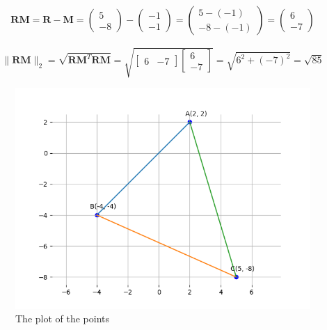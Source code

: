 \documentclass[journal]{IEEEtran}
\numberwithin{equation}{enumi}
\numberwithin{figure}{enumi}
\begin{document}
\begin{align}
\mathbf{RM} = \mathbf{R} - \mathbf{M} = \begin{pmatrix} 5 \\ -8 \end{pmatrix} - \begin{pmatrix} -1 \\ -1 \end{pmatrix} = \begin{pmatrix} 5 - (-1) \\ -8 - (-1) \end{pmatrix} = \begin{pmatrix} 6 \\ -7 \end{pmatrix}
\end{align}





\[
\| \mathbf{RM} \|_2 = \sqrt{\mathbf{RM}^T \mathbf{RM}} = \sqrt{\begin{bmatrix} 6 & -7 \end{bmatrix} \begin{bmatrix} 6 \\ -7 \end{bmatrix}} = \sqrt{6^2 + (-7)^2} = \sqrt{85}
\]





\begin{figure}[h!]
  \hspace{-1cm}
  \includegraphics[width=1.2\textwidth]{Figure_1.png}
  
  \caption{The plot of the points }
  \label{fig:your_label}
\end{figure}
\end{document}
